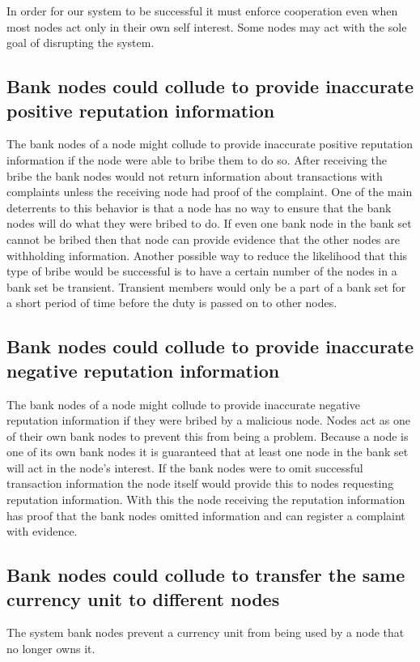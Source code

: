 \documentclass[%
				10pt,
        final,
        notitlepage,
        narroweqnarray,
        inline,
        twoside,
        ]{ieee}
\begin{document}
In order for our system to be successful it must enforce cooperation even when most nodes act only in their own self interest.  Some nodes may act with the sole goal of disrupting the system.  

\subsection{Bank nodes could collude to provide inaccurate positive reputation information}
The bank nodes of a node might collude to provide inaccurate positive reputation information if the node were able to bribe them to do so. After receiving the bribe the bank nodes would not return information about transactions with complaints unless the receiving node had proof of the complaint. One of the main deterrents to this behavior is that a node has no way to ensure that the bank nodes will do what they were bribed to do.  If even one bank node in the bank set cannot be bribed then that node can provide evidence that the other nodes are withholding information.  Another possible way to reduce the likelihood that this type of bribe would be successful is to have a certain number of the nodes in a bank set be transient.  Transient members would only be a part of a bank set for a short period of time before the duty is passed on to other nodes.

\subsection{Bank nodes could collude to provide inaccurate negative reputation information}
The bank nodes of a node might collude to provide inaccurate negative reputation information if they were bribed by a malicious node.  Nodes act as one of their own bank nodes to prevent this from being a problem.  Because a node is one of its own bank nodes it is guaranteed that at least one node in the bank set will act in the node's interest.  If the bank nodes were to omit successful transaction information the node itself would provide this to nodes requesting reputation information.  With this the node receiving the reputation information has proof that the bank nodes omitted information and can register a complaint with evidence.  

\subsection{Bank nodes could collude to transfer the same currency unit to different nodes}
The system bank nodes prevent a currency unit from being used by a node that no longer owns it.
\end{document}
